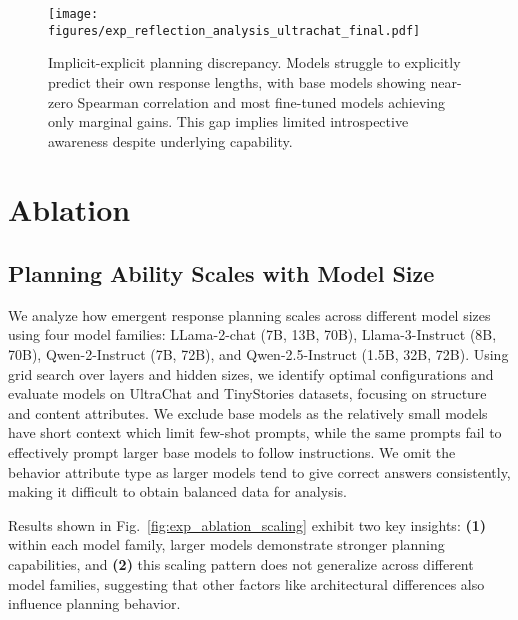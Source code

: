 \begin{figure}[tb!]
    \centering
    \texttt{[image: figures/exp\_reflection\_analysis\_ultrachat\_final.pdf]}
    \vspace{-30pt}
    \caption{Implicit-explicit planning discrepancy. Models struggle to explicitly predict their own response lengths, with base models showing near-zero Spearman correlation and most fine-tuned models achieving only marginal gains. This gap implies limited introspective awareness despite underlying capability.}
    \label{fig:exp_ablation_selfAware_ultrachat}
    \vspace{-18pt}
\end{figure}

\section{Ablation}

\subsection{Planning Ability Scales with Model Size}
We analyze how emergent response planning scales across different model sizes using four model families: LLama-2-chat (7B, 13B, 70B), Llama-3-Instruct (8B, 70B), Qwen-2-Instruct (7B, 72B), and Qwen-2.5-Instruct (1.5B, 32B, 72B). Using grid search over layers and hidden sizes, we identify optimal configurations and evaluate models on UltraChat and TinyStories datasets, focusing on structure and content attributes.
We exclude base models as the relatively small models have short context which limit few-shot prompts, while the same prompts fail to effectively prompt larger base models to follow instructions. We omit the behavior attribute type as larger models tend to give correct answers consistently, making it difficult to obtain balanced data for analysis.

Results shown in Fig.~\ref{fig:exp_ablation_scaling} exhibit two key insights:  \textbf{(1)} within each model family, larger models demonstrate stronger planning capabilities, and \textbf{(2)} this scaling pattern does not generalize across different model families, suggesting that other factors like architectural differences also influence planning behavior.





